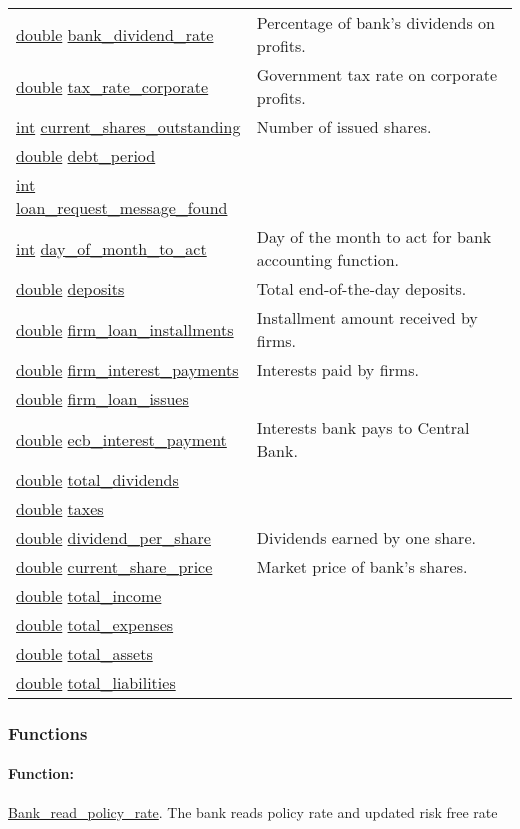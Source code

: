 \documentclass[a4paper,11pt]{article}
\begin{document}
\begin{center}
\begin{longtable}[H!]{ll}
\url{double} \url{bank_dividend_rate} & \parbox{10cm}{Percentage of bank's dividends on profits.} \\
\url{double} \url{tax_rate_corporate} & \parbox{10cm}{Government tax rate on corporate profits.} \\
\url{int} \url{current_shares_outstanding} & \parbox{10cm}{Number of issued shares.} \\
\url{double} \url{debt_period} & \parbox{10cm}{} \\
\url{int} \url{loan_request_message_found} & \parbox{10cm}{} \\
\url{int} \url{day_of_month_to_act} & \parbox{10cm}{Day of the month to act for bank accounting function.} \\
\url{double} \url{deposits} & \parbox{10cm}{Total end-of-the-day deposits.} \\
\url{double} \url{firm_loan_installments} & \parbox{10cm}{Installment amount received by firms.} \\
\url{double} \url{firm_interest_payments} & \parbox{10cm}{Interests paid by firms.} \\
\url{double} \url{firm_loan_issues} & \parbox{10cm}{} \\
\url{double} \url{ecb_interest_payment} & \parbox{10cm}{Interests bank pays to Central Bank.} \\
\url{double} \url{total_dividends} & \parbox{10cm}{} \\
\url{double} \url{taxes} & \parbox{10cm}{} \\
\url{double} \url{dividend_per_share} & \parbox{10cm}{Dividends earned by one share.} \\
\url{double} \url{current_share_price} & \parbox{10cm}{Market price of bank's shares.} \\
\url{double} \url{total_income} & \parbox{10cm}{} \\
\url{double} \url{total_expenses} & \parbox{10cm}{} \\
\url{double} \url{total_assets} & \parbox{10cm}{} \\
\url{double} \url{total_liabilities} & \parbox{10cm}{} \\
\end{longtable}
\end{center}
\subsubsection{Functions}
\paragraph{Function:}\url{Bank_read_policy_rate}.
The bank reads policy rate and updated risk free rate
\end{document}
